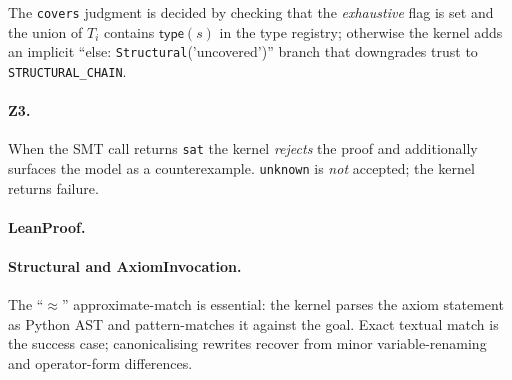 The \texttt{covers} judgment is decided by checking that the
\emph{exhaustive} flag is set and the union of $T_i$ contains
$\mathsf{type}(s)$ in the type registry; otherwise the kernel
adds an implicit ``else: \texttt{Structural}('uncovered')'' branch
that downgrades trust to \texttt{STRUCTURAL\_CHAIN}.

\paragraph{Z3.}
\begin{mathpar}
\end{mathpar}

When the SMT call returns \texttt{sat} the kernel \emph{rejects}
the proof and additionally surfaces the model as a counterexample.
\texttt{unknown} is \emph{not} accepted; the kernel returns failure.

\paragraph{LeanProof.}
\begin{mathpar}
\end{mathpar}

\paragraph{Structural and AxiomInvocation.}

The ``$\approx$'' approximate-match is essential: the kernel parses
the axiom statement as Python AST and pattern-matches it against the
goal.  Exact textual match is the success case; canonicalising
rewrites recover from minor variable-renaming and operator-form
differences.

